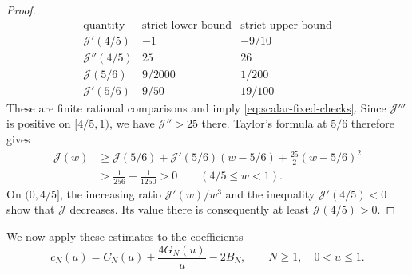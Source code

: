 \begin{proof}
\begin{equation*}
  \begin{array}{c|c|c}
    \text{quantity}&\text{strict lower bound}&\text{strict upper bound}\\ \hline
    \mathcal J'(4/5)&-1&-9/10\\
    \mathcal J''(4/5)&25&26\\
    \mathcal J(5/6)&9/2000&1/200\\
    \mathcal J'(5/6)&9/50&19/100
  \end{array}
\end{equation*}
These are finite rational comparisons and imply
\eqref{eq:scalar-fixed-checks}.
Since $\mathcal J'''$ is positive on $[4/5,1)$, we have
$\mathcal J''>25$ there. Taylor's formula at $5/6$ therefore gives
\begin{align*}
  \mathcal J(w)
  &\ge\mathcal J(5/6)+\mathcal J'(5/6)(w-5/6)
  +\frac{25}{2}(w-5/6)^2\\
  &>\frac1{256}-\frac1{1250}>0
  \qquad(4/5\le w<1).
\end{align*}
On $(0,4/5]$, the increasing ratio $\mathcal J'(w)/w^3$
and the inequality $\mathcal J'(4/5)<0$ show that
$\mathcal J$ decreases. Its value there is consequently at least
$\mathcal J(4/5)>0$.
\end{proof}
We now apply these estimates to the coefficients
\begin{equation*}
  c_N(u)=C_N(u)+\frac{4G_N(u)}u-2B_N,
  \qquad N\ge1,\quad 0<u\le1.
\end{equation*}

